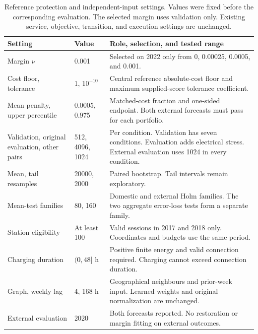 \documentclass[journal]{IEEEtran}
\newcommand{\DIFnewtablecolor}{\color{blue}}
\begin{document}
\begin{table}[t]\DIFnewtablecolor
\centering
\caption{Reference protection and independent-input settings. Values were fixed before the corresponding evaluation. The selected margin uses validation only. Existing service, objective, transition, and execution settings are unchanged.}
\label{tab:guarded-parameters}
\footnotesize\setlength{\tabcolsep}{3pt}\renewcommand{\arraystretch}{1.08}
\begin{tabular}{@{}p{}p{}p{}@{}}
\toprule
Setting & Value & Role, selection, and tested range \\
\midrule
Margin $\nu$ & 0.001 & Selected on 2022 only from 0, 0.00025, 0.0005, and 0.001. \\
Cost floor, tolerance & 1, $10^{-10}$ & Central reference absolute-cost floor and maximum supplied-score tolerance coefficient. \\
Mean penalty, upper percentile & 0.0005, 0.975 & Matched-cost fraction and one-sided endpoint. Both external forecasts must pass for each portfolio. \\
Validation, original evaluation, other pairs & 512, 4096, 1024 & Per condition. Validation has seven conditions. Evaluation adds electrical stress. External evaluation uses 1024 in every condition. \\
Mean, tail resamples & 20000, 2000 & Paired bootstrap. Tail intervals remain exploratory. \\
Mean-test families & 80, 160 & Domestic and external Holm families. The two aggregate error-loss tests form a separate family. \\
Station eligibility & At least 100 & Valid sessions in 2017 and 2018 only. Coordinates and budgets use the same period. \\
Charging duration & $(0,48]$ h & Positive finite energy and valid connection required. Charging cannot exceed connection duration. \\
Graph, weekly lag & 4, 168 h & Geographical neighbours and prior-week input. Learned weights and original normalization are unchanged. \\
External evaluation & 2020 & Both forecasts reported. No restoration or margin fitting on external outcomes. \\
\bottomrule
\end{tabular}
\end{table}
\end{document}
